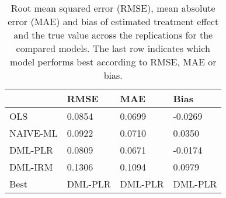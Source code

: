 \begin{table}[H]
\centering
\caption{Root mean squared error (RMSE), mean absolute error (MAE) and bias of estimated treatment effect and the true value across the replications for the compared models. The last row indicates which model performs best according to RMSE, MAE or bias.}
\label{Scenario2}
\begin{tabular}{L{3.3333333333333335cm}L{2.6666666666666665cm}R{2.0cm}R{2.6666666666666665cm}}
\toprule
 & RMSE & MAE & Bias \\
\midrule
OLS & 0.0854 & 0.0699 & -0.0269 \\
NAIVE-ML & 0.0922 & 0.0710 & 0.0350 \\
DML-PLR & 0.0809 & 0.0671 & -0.0174 \\
DML-IRM & 0.1306 & 0.1094 & 0.0979 \\
Best & DML-PLR & DML-PLR & DML-PLR \\
\bottomrule
\end{tabular}
\end{table}
